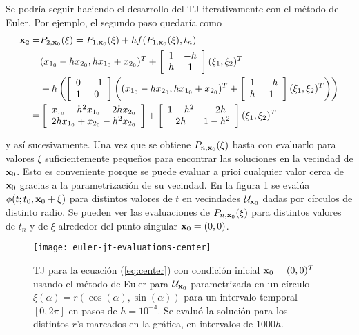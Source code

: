 Se podría seguir haciendo el desarrollo del TJ iterativamente con el método de Euler. Por ejemplo, el segundo paso quedaría como 
\begin{align*}
\mathbf{x}_2 =& P_{2,\mathbf{x}_0}(\xi) = P_{1,\mathbf{x}_0}(\xi) + h f(P_{1,\mathbf{x}_0}(\xi),t_n) \\
=& (x_{1_0} - h x_{2_0}, h x_{1_0} + x_{2_0} )^T + \left[ \begin{array}{cc}
 1 & -h  \\
h & 1  \\
\end{array} \right] (\xi_1,\xi_2)^T \\ 
&+ h \left( \left[ \begin{array}{cc}
 0 & -1  \\
 1 &  0  \\
\end{array} \right] \left( (x_{1_0} - h x_{2_0}, h x_{1_0} + x_{2_0} )^T + \left[ \begin{array}{cc}
 1 & -h  \\
h & 1  \\
\end{array} \right] (\xi_1,\xi_2)^T \right) \right) \\
=& \left[ \begin{array}{c}
x_{1_0} - h^2x_{1_0} - 2h x_{2_0}  \\
2h x_{1_0} + x_{2_0}  - h^2x_{2_0}  \\
\end{array} \right] + \left[ \begin{array}{cc}
 1-h^2 & -2h  \\
2h & 1-h^2  \\
\end{array} \right] (\xi_1,\xi_2)^T
\end{align*}
 
y así sucesivamente. Una vez que se obtiene $P_{n,\mathbf{x}_0}(\xi)$ basta con evaluarlo para valores $\mathbb{\xi}$ suficientemente pequeños para encontrar las soluciones en la vecindad de $\mathbf{x}_0$. Esto es conveniente porque se puede evaluar a prioi cualquier valor cerca de $\mathbf{x}_0$ gracias a la parametrización de su vecindad. En la figura \ref{fig:center-evals} se evalúa $\phi(t;t_0,\mathbf{x}_0 + \xi)$ para distintos valores de $t$ en vecindades $\mathcal{U}_{\mathbf{x}_0}$ dadas por círculos de distinto radio. Se pueden ver las evaluaciones de $P_{n,\mathbf{x}_0}(\xi)$ para distintos valores de $t_n$ y de $\xi$ alrededor del punto singular $\mathbf{x}_0 = (0,0)$.

\begin{figure}[h!]
 \centering
 \texttt{[image: euler-jt-evaluations-center]}
 \caption{TJ para la ecuación (\ref{eq:center}) con condición inicial $\mathbf{x}_0 = (0,0)^T$ usando el método de Euler para $\mathcal{U}_{\mathbf{x}_0}$ parametrizada en un círculo $\xi(\alpha) = r\left( \cos(\alpha),\sin(\alpha) \right)$ para un intervalo temporal $[0,2\pi]$ en pasos de $h=10^{-4}$. Se evaluó la solución para los distintos $r$'s marcados en la gráfica, en intervalos de $1000h$.}
 \label{fig:center-evals}
\end{figure}

